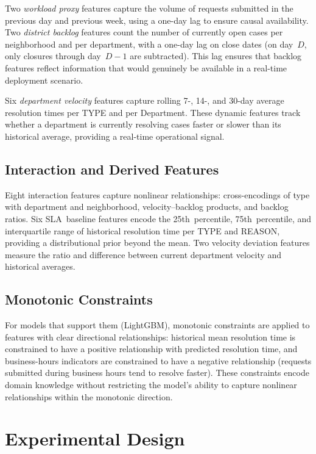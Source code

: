 \documentclass[sigconf,nonacm]{acmart}
\begin{document}
Two \emph{workload proxy} features capture the volume of requests
submitted in the previous day and previous week, using a one-day
lag to ensure causal availability. Two \emph{district backlog}
features count the number of currently open cases per
neighborhood and per department, with a one-day lag on close dates
(on day~$D$, only closures through day~$D{-}1$ are subtracted).
This lag ensures that backlog features reflect information that
would genuinely be available in a real-time deployment scenario.

Six \emph{department velocity} features capture rolling 7-, 14-,
and 30-day average resolution times per TYPE and per Department.
These dynamic features track whether a department is currently
resolving cases faster or slower than its historical average,
providing a real-time operational signal.

\subsection{Interaction and Derived Features}

Eight interaction features capture nonlinear relationships:
cross-encodings of type with department and neighborhood,
velocity--backlog products, and backlog ratios. Six SLA~baseline features encode the
25th~percentile, 75th~percentile, and interquartile range of
historical resolution time per TYPE and REASON, providing a
distributional prior beyond the mean. Two velocity deviation
features measure the ratio and difference between current
department velocity and historical averages.

\subsection{Monotonic Constraints}

For models that support them (LightGBM), monotonic constraints
are applied to features with clear directional relationships:
historical mean resolution time is constrained to have a positive
relationship with predicted resolution time, and business-hours
indicators are constrained to have a negative relationship
(requests submitted during business hours tend to resolve faster).
These constraints encode domain knowledge without restricting the
model's ability to capture nonlinear relationships within the
monotonic direction.

\section{Experimental Design}
\label{sec:design}
\end{document}
